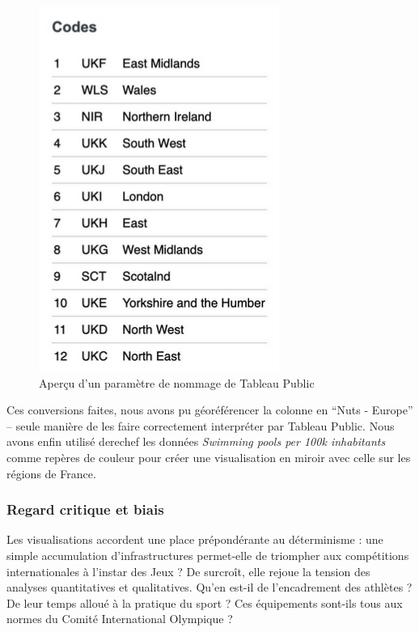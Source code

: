 \documentclass[hidelinks, 12pt]{report}
\begin{document}
\begin{center}
	\begin{figure}[H]
		\centering
		\setlength{\belowcaptionskip}{-35pt}
		\includegraphics[scale=0.5]{images/datavis-swim-fr-eng-codes.png}
		\captionsetup{justification=centering}
		\caption{Aperçu d'un paramètre de nommage de Tableau Public}
	\end{figure}
\end{center}

Ces conversions faites, nous avons pu géoréférencer la colonne en \enquote{Nuts - Europe} -- seule manière de les faire correctement interpréter par Tableau Public. Nous avons enfin utilisé derechef les données \textit{Swimming pools per 100k inhabitants} comme repères de couleur pour créer une visualisation en miroir avec celle sur les régions de France.





%





\subsubsection{Regard critique et biais}

\label{biais}Les visualisations accordent une place prépondérante au déterminisme : une simple accumulation d'infrastructures permet-elle de triompher aux compétitions internationales à l'instar des Jeux ? De surcroît, elle rejoue la tension des analyses quantitatives et qualitatives. Qu'en est-il de l'encadrement des athlètes ? De leur temps alloué à la pratique du sport ? Ces équipements sont-ils tous aux normes du Comité International Olympique ?
\end{document}
